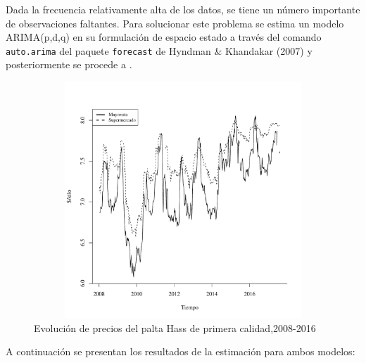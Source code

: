 \documentclass[12pt, twoside]{book}\usepackage[]{graphicx}\usepackage[]{color}
\newenvironment{knitrout}{}{} %
\numberwithin{equation}{section}
\numberwithin{theorem}{section}
\numberwithin{teorema}{section}
\numberwithin{defi}{section}
\numberwithin{prop}{section}
\numberwithin{defi}{section}
\theoremstyle{plain}
\begin{document}
Dada la frecuencia relativamente alta de los datos, se tiene un número importante de observaciones faltantes. Para solucionar este problema se estima un modelo ARIMA(p,d,q) en su formulación de espacio estado a través del comando \texttt{auto.arima} del paquete \texttt{forecast} de Hyndman \& Khandakar (2007) y posteriormente se procede a .



\begin{knitrout}
\color{fgcolor}\begin{figure}[H]

{\centering \includegraphics[width=6.5in,height=3.5in]{figure/fig-2-1} 

}

\caption[Evolución de precios del palta Hass de primera calidad,2008-2016]{Evolución de precios del palta Hass de primera calidad,2008-2016}\label{fig:fig-2}
\end{figure}


\end{knitrout}

A continuación se presentan los resultados de la estimación para ambos modelos: 
\end{document}
